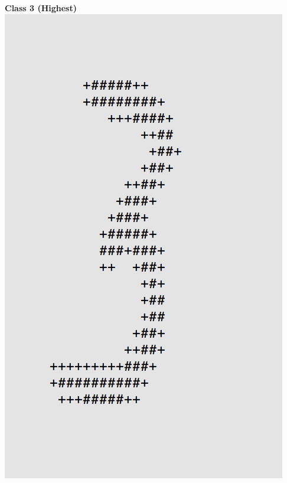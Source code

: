 \documentclass[11pt]{article}
\begin{document}
\begin{center}
\begin{multicols}{2}
\textbf{Class 3 (Highest)}\\
\includegraphics[scale=0.4]{part1/1/high_3.png}


\end{multicols}
\end{center}
\end{document}

